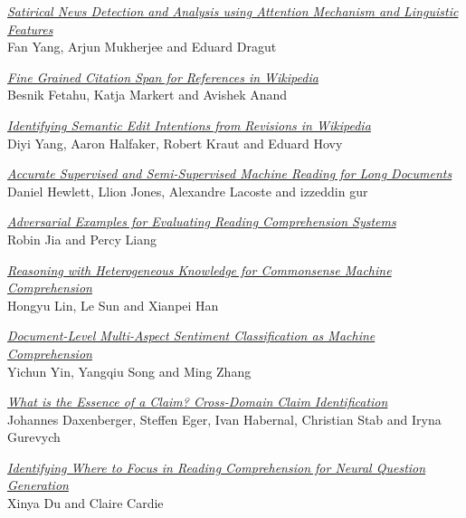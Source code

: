 \hyperlink{page.1968}{\em Satirical News Detection and Analysis using Attention Mechanism and Linguistic Features}\samepage \\
\hspace*{7mm} Fan Yang, Arjun Mukherjee and Eduard Dragut\dotfill {}

\hyperlink{page.1979}{\em Fine Grained Citation Span for References in Wikipedia}\samepage \\
\hspace*{7mm} Besnik Fetahu, Katja Markert and Avishek Anand\dotfill {}

\hyperlink{page.1989}{\em Identifying Semantic Edit Intentions from Revisions in Wikipedia}\samepage \\
\hspace*{7mm} Diyi Yang, Aaron Halfaker, Robert Kraut and Eduard Hovy\dotfill {}

\hyperlink{page.2000}{\em Accurate Supervised and Semi-Supervised Machine Reading for Long Documents}\samepage \\
\hspace*{7mm} Daniel Hewlett, Llion Jones, Alexandre Lacoste and izzeddin gur\dotfill {}

\hyperlink{page.2010}{\em Adversarial Examples for Evaluating Reading Comprehension Systems}\samepage \\
\hspace*{7mm} Robin Jia and Percy Liang\dotfill {}

\hyperlink{page.2021}{\em Reasoning with Heterogeneous Knowledge for Commonsense Machine Comprehension}\samepage \\
\hspace*{7mm} Hongyu Lin, Le Sun and Xianpei Han\dotfill {}

\hyperlink{page.2033}{\em Document-Level Multi-Aspect Sentiment Classification as Machine Comprehension}\samepage \\
\hspace*{7mm} Yichun Yin, Yangqiu Song and Ming Zhang\dotfill {}

\hyperlink{page.2044}{\em What is the Essence of a Claim? Cross-Domain Claim Identification}\samepage \\
\hspace*{7mm} Johannes Daxenberger, Steffen Eger, Ivan Habernal, Christian Stab and Iryna Gurevych\dotfill {}

\hyperlink{page.2056}{\em Identifying Where to Focus in Reading Comprehension for Neural Question Generation}\samepage \\
\hspace*{7mm} Xinya Du and Claire Cardie\dotfill {}

